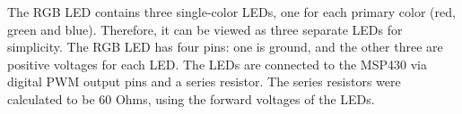 The RGB LED contains three single-color LEDs, one for each primary color (red, green and blue). Therefore, it can be viewed as three separate LEDs for simplicity. The RGB LED has four pins: one is ground, and the other three are positive voltages for each LED. The LEDs are connected to the MSP430 via digital PWM output pins and a series resistor. The series resistors were calculated to be 60 Ohms, using the forward voltages of the LEDs.

